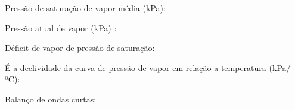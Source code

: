 \documentclass[
]{book}
\newenvironment{Shaded}{\begin{snugshade}}{\end{snugshade}}
\newcommand{\DecValTok}[1]{\textcolor[rgb]{0.00,0.00,0.81}{#1}}
\newcommand{\FloatTok}[1]{\textcolor[rgb]{0.00,0.00,0.81}{#1}}
\newcommand{\NormalTok}[1]{#1}
\newcommand{\OperatorTok}[1]{\textcolor[rgb]{0.81,0.36,0.00}{\textbf{#1}}}
\newcommand{\StringTok}[1]{\textcolor[rgb]{0.31,0.60,0.02}{#1}}
\begin{document}
Pressão de saturação de vapor média (kPa):

\begin{Shaded}
\end{Shaded}

Pressão atual de vapor (kPa) :

\begin{Shaded}
\end{Shaded}

Déficit de vapor de pressão de saturação:

\begin{Shaded}
\end{Shaded}

É a declividade da curva de pressão de vapor em relação a temperatura (kPa/ºC):

\begin{Shaded}
\end{Shaded}

Balanço de ondas curtas:

\begin{Shaded}
\end{Shaded}
\end{document}
